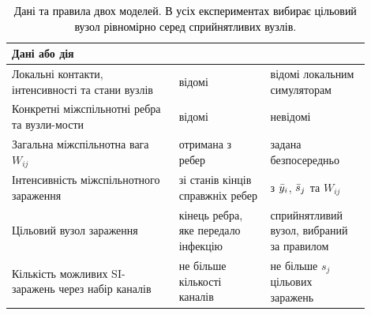 \begin{table}[tbp]
\color{black}\centering
\caption{\textcolor{black}{Дані та правила двох моделей. В усіх експериментах \TS{} вибирає цільовий вузол рівномірно серед сприйнятливих вузлів.}}
\label{tab:information}
\small
\begin{tabular}{>{\raggedright\arraybackslash}p{0.42\linewidth}>{\raggedright\arraybackslash}p{0.23\linewidth}>{\raggedright\arraybackslash}p{0.25\linewidth}}
\toprule
Дані або дія & \Full{} & \TS{}\\
\midrule
Локальні контакти, інтенсивності та стани вузлів & відомі & відомі локальним симуляторам\\
Конкретні міжспільнотні ребра та вузли-мости & відомі & невідомі\\
Загальна міжспільнотна вага $W_{ij}$ & отримана з ребер & задана безпосередньо\\
Інтенсивність міжспільнотного зараження & зі станів кінців справжніх ребер & з $\bar{y}_i$, $\bar{s}_j$ та $W_{ij}$\\
Цільовий вузол зараження & кінець ребра, яке передало інфекцію & сприйнятливий вузол, вибраний за правилом\\
Кількість можливих SI-заражень через набір каналів & не більше кількості каналів & не більше $s_j$ цільових заражень\\
\bottomrule
\end{tabular}
\end{table}

